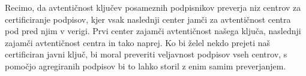 \begin{primer}
    Recimo, da avtentičnost ključev posameznih podpisnikov preverja niz centrov za certificiranje
    podpisov, kjer vsak naslednji center jamči za avtentičnost centra pod pred njim v verigi. Prvi center zajamči
    avtentičnost našega ključa, naslednji zajamči avtentičnost centra in tako naprej. Ko bi želel
    nekdo prejeti naš certificiran javni ključ, bi moral preveriti veljavnost podpisov vseh centrov,
    s pomočjo agregiranih podpisov bi to lahko storil z enim samim preverjanjem.
\end{primer}
